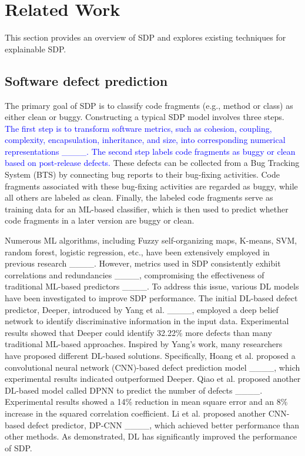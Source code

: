 \section{Related Work}
This section provides an overview of SDP and explores existing techniques for explainable SDP.
\subsection{Software defect prediction}\label{subsec_2}
The primary goal of SDP is to classify code fragments (e.g., method or class) as either clean or buggy. Constructing a typical SDP model involves three steps. \textcolor{blue}{The first step is to transform software metrics, such as cohesion, coupling, complexity, encapsulation, inheritance, and size, into corresponding numerical representations ____.} \textcolor{blue}{The second step labels code fragments as buggy or clean based on post-release defects.} These defects can be collected from a Bug Tracking System (BTS) by connecting bug reports to their bug-fixing activities. Code fragments associated with these bug-fixing activities are regarded as buggy, while all others are labeled as clean. Finally, the labeled code fragments serve as training data for an ML-based classifier, which is then used to predict whether code fragments in a later version are buggy or clean.

Numerous ML algorithms, including Fuzzy self-organizing maps, K-means, SVM, random forest, logistic regression, etc., have been extensively employed in previous research ____. However, metrics used in SDP consistently exhibit correlations and redundancies ____, compromising the effectiveness of traditional ML-based predictors ____. To address this issue, various DL models have been investigated to improve SDP performance. The initial DL-based defect predictor, Deeper, introduced by Yang et al. ____, employed a deep belief network to identify discriminative information in the input data. Experimental results showed that Deeper could identify 32.22\% more defects than many traditional ML-based approaches.
Inspired by Yang’s work, many researchers have proposed different DL-based solutions. Specifically, Hoang et al. proposed a convolutional neural network (CNN)-based defect prediction model ____, which experimental results indicated outperformed Deeper. Qiao et al. proposed another DL-based model called DPNN to predict the number of defects ____. Experimental results showed a 14\% reduction in mean square error and an 8\% increase in the squared correlation coefficient. Li et al. proposed another CNN-based defect predictor, DP-CNN ____, which achieved better performance than other methods. As demonstrated, DL has significantly improved the performance of SDP.

